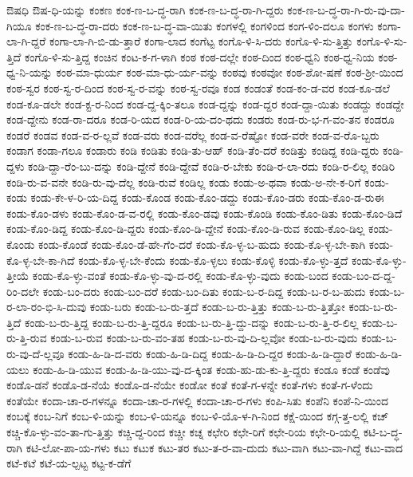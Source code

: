 {ಔಷಧಿ
ಔಷ-ಧಿ-ಯನ್ನು
ಕಂಕಣ
ಕಂಕ-ಣ-ಬ-ದ್ಧ-ರಾಗಿ
ಕಂಕ-ಣ-ಬ-ದ್ಧ-ರಾ-ಗಿ-ದ್ದರು
ಕಂಕ-ಣ-ಬ-ದ್ಧ-ರಾ-ಗಿ-ರು-ವು-ದಾ-ಗಿಯೂ
ಕಂಕ-ಣ-ಬ-ದ್ಧ-ರಾ-ದರು
ಕಂಕ-ಣ-ಬ-ದ್ಧ-ವಾ-ಯಿತು
ಕಂಗಳಲ್ಲಿ
ಕಂಗಳಿಂದ
ಕಂಗ-ಳಿಂ-ದಲೂ
ಕಂಗಳು
ಕಂಗಾ-ಲಾ-ಗಿ-ದ್ದರೆ
ಕಂಗಾ-ಲಾ-ಗಿ-ಬಿ-ಡು-ತ್ತಾರೆ
ಕಂಗಾ-ಲಾದ
ಕಂಗೆಟ್ಟ
ಕಂಗೊ-ಳಿ-ಸಿ-ದರು
ಕಂಗೊ-ಳಿ-ಸು-ತ್ತಿತ್ತು
ಕಂಗೊ-ಳಿ-ಸು-ತ್ತಿದೆ
ಕಂಗೊ-ಳಿ-ಸು-ತ್ತಿದ್ದ
ಕಂಚಿನ
ಕಂಟ-ಕ-ಗ-ಳಾಗಿ
ಕಂಠ
ಕಂಠ-ದಲ್ಲೇ
ಕಂಠ-ದಿಂದ
ಕಂಠ-ಧ್ವನಿ
ಕಂಠ-ಧ್ವ-ನಿಯ
ಕಂಠ-ಧ್ವ-ನಿ-ಯನ್ನು
ಕಂಠ-ಮಾ-ಧುರ್ಯ
ಕಂಠ-ಮಾ-ಧು-ರ್ಯ-ವನ್ನು
ಕಂಠವು
ಕಂಠವೋ
ಕಂಠ-ಶೋ-ಷಣೆ
ಕಂಠ-ಶ್ರೀ-ಯಿಂದ
ಕಂಠ-ಸ್ವರ
ಕಂಠ-ಸ್ವ-ರ-ದಿಂದ
ಕಂಠ-ಸ್ವ-ರ-ವನ್ನು
ಕಂಠ-ಸ್ವ-ರವೂ
ಕಂಡ
ಕಂಡಂತೆ
ಕಂಡ-ಕಂ-ಡ-ವರ
ಕಂಡ-ಕೂ-ಡಲೆ
ಕಂಡ-ಕೂ-ಡಲೇ
ಕಂಡ-ಕ್ಟ-ರ-ನಿಂದ
ಕಂಡ-ದ್ದ-ಕ್ಕಿಂ-ತಲೂ
ಕಂಡ-ದ್ದನ್ನು
ಕಂಡ-ದ್ದರ
ಕಂಡ-ದ್ದಾ-ಯಿತು
ಕಂಡದ್ದು
ಕಂಡದ್ದೇ
ಕಂಡ-ದ್ದೇನು
ಕಂಡ-ರಾ-ದರೂ
ಕಂಡ-ರಿ-ಯದ
ಕಂಡ-ರಿ-ಯ-ದಂ-ಥದು
ಕಂಡರು
ಕಂಡ-ರು-ಭ-ಗ-ವಂ-ತನ
ಕಂಡರೂ
ಕಂಡರೆ
ಕಂಡವ
ಕಂಡ-ವ-ರ-ಲ್ಲವೆ
ಕಂಡ-ವರು
ಕಂಡ-ವರೆಲ್ಲ
ಕಂಡ-ವ-ರೆಷ್ಟೋ
ಕಂಡ-ವರೇ
ಕಂಡ-ವ-ರೊ-ಬ್ಬರು
ಕಂಡಾಗ
ಕಂಡಾ-ಗಲೂ
ಕಂಡಾರು
ಕಂಡಿ
ಕಂಡಿತು
ಕಂಡಿ-ತು-ಆಹ್
ಕಂಡಿ-ತೆಂ-ದರೆ
ಕಂಡಿತ್ತು
ಕಂಡಿದ್ದ
ಕಂಡಿ-ದ್ದರು
ಕಂಡಿ-ದ್ದಳು
ಕಂಡಿ-ದ್ದಾ-ರೆಂ-ಬು-ದನ್ನು
ಕಂಡಿ-ದ್ದೇನೆ
ಕಂಡಿ-ದ್ದೇವೆ
ಕಂಡಿ-ರ-ಬೇಕು
ಕಂಡಿ-ರ-ಲಾ-ರದು
ಕಂಡಿ-ರ-ಲಿಲ್ಲ
ಕಂಡಿರಿ
ಕಂಡಿ-ರು-ವ-ವನೇ
ಕಂಡಿ-ರು-ವು-ದೆಲ್ಲ
ಕಂಡಿ-ರುವೆ
ಕಂಡಿಲ್ಲ
ಕಂಡು
ಕಂಡು-ಅ-ಥವಾ
ಕಂಡು-ಅ-ನೇ-ಕ-ರಿಗೆ
ಕಂಡು-ಕಂಡು
ಕಂಡು-ಕೇ-ಳ-ರಿ-ಯ-ದಿದ್ದ
ಕಂಡು-ಕೊಂಡ
ಕಂಡು-ಕೊಂ-ಡದ್ದು
ಕಂಡು-ಕೊಂ-ಡರು
ಕಂಡು-ಕೊಂ-ಡ-ರುಈ
ಕಂಡು-ಕೊಂ-ಡಳು
ಕಂಡು-ಕೊಂ-ಡ-ವ-ರಲ್ಲಿ
ಕಂಡು-ಕೊಂ-ಡವು
ಕಂಡು-ಕೊಂಡಿ
ಕಂಡು-ಕೊಂ-ಡಿತು
ಕಂಡು-ಕೊಂ-ಡಿದೆ
ಕಂಡು-ಕೊಂ-ಡಿದ್ದ
ಕಂಡು-ಕೊಂ-ಡಿ-ದ್ದರು
ಕಂಡು-ಕೊಂ-ಡಿ-ದ್ದೇನೆ
ಕಂಡು-ಕೊಂ-ಡಿ-ರುವ
ಕಂಡು-ಕೊಂ-ಡಿಲ್ಲ
ಕಂಡು-ಕೊಂಡು
ಕಂಡು-ಕೊಂಡೆ
ಕಂಡು-ಕೊಂ-ಡೆ-ಹೇ-ಗೆಂ-ದರೆ
ಕಂಡು-ಕೊ-ಳ್ಳ-ಬ-ಹುದು
ಕಂಡು-ಕೊ-ಳ್ಳ-ಬೇ-ಕಾಗಿ
ಕಂಡು-ಕೊ-ಳ್ಳ-ಬೇ-ಕಾ-ಗಿದೆ
ಕಂಡು-ಕೊ-ಳ್ಳ-ಬೇ-ಕೆಂದು
ಕಂಡು-ಕೊ-ಳ್ಳಲು
ಕಂಡು-ಕೊಳ್ಳಿ
ಕಂಡು-ಕೊ-ಳ್ಳು-ತ್ತದೆ
ಕಂಡು-ಕೊ-ಳ್ಳು-ತ್ತೀಯೆ
ಕಂಡು-ಕೊ-ಳ್ಳು-ವಂತೆ
ಕಂಡು-ಕೊ-ಳ್ಳು-ವು-ದ-ರಲ್ಲಿ
ಕಂಡು-ಕೊ-ಳ್ಳು-ವುದು
ಕಂಡು-ಬಂದ
ಕಂಡು-ಬಂ-ದ-ದ್ದ-ರಿಂ-ದಲೇ
ಕಂಡು-ಬಂ-ದರು
ಕಂಡು-ಬಂ-ದರೆ
ಕಂಡು-ಬಂ-ದಿತು
ಕಂಡು-ಬ-ರ-ದಿದ್ದ
ಕಂಡು-ಬ-ರ-ಬ-ಹುದು
ಕಂಡು-ಬ-ರ-ಲಾ-ರಂ-ಭಿ-ಸಿ-ದುವು
ಕಂಡು-ಬರು
ಕಂಡು-ಬ-ರು-ತ್ತದೆ
ಕಂಡು-ಬ-ರು-ತ್ತಿತ್ತು
ಕಂಡು-ಬ-ರು-ತ್ತಿತ್ತೋ
ಕಂಡು-ಬ-ರು-ತ್ತಿದೆ
ಕಂಡು-ಬ-ರು-ತ್ತಿದ್ದ
ಕಂಡು-ಬ-ರು-ತ್ತಿ-ದ್ದರೂ
ಕಂಡು-ಬ-ರು-ತ್ತಿ-ದ್ದು-ದನ್ನು
ಕಂಡು-ಬ-ರು-ತ್ತಿ-ರ-ಲಿಲ್ಲ
ಕಂಡು-ಬ-ರು-ತ್ತಿ-ರುವ
ಕಂಡು-ಬ-ರುವ
ಕಂಡು-ಬ-ರು-ವಂ-ತಹ
ಕಂಡು-ಬ-ರು-ವು-ದಿ-ಲ್ಲವೋ
ಕಂಡು-ಬ-ರು-ವುದು
ಕಂಡು-ಬ-ರು-ವು-ದೆ-ಲ್ಲವೂ
ಕಂಡು-ಹಿ-ಡಿ-ದ-ವರು
ಕಂಡು-ಹಿ-ಡಿ-ದಿದ್ದ
ಕಂಡು-ಹಿ-ಡಿ-ದಿ-ದ್ದರ
ಕಂಡು-ಹಿ-ಡಿ-ದ್ದಾರೆ
ಕಂಡು-ಹಿ-ಡಿ-ಯಲು
ಕಂಡು-ಹಿ-ಡಿ-ಯುವ
ಕಂಡು-ಹಿ-ಡಿ-ಯು-ವು-ದ-ಕ್ಕಿಂತ
ಕಂಡು-ಹು-ಡು-ಕು-ತ್ತಿ-ದ್ದರು
ಕಂಡೂ
ಕಂಡೆ
ಕಂಡೆವು
ಕಂಡೊ-ಡನೆ
ಕಂಡೊ-ಡ-ನೆಯೆ
ಕಂಡೊ-ಡ-ನೆಯೇ
ಕಂಡೋ
ಕಂತೆ
ಕಂತೆ-ಗ-ಳನ್ನೇ
ಕಂತೆ-ಗಳು
ಕಂತೆ-ಗ-ಳೆಂದು
ಕಂತೆಯೇ
ಕಂದಾ-ಚಾ-ರ-ಗಳನ್ನೂ
ಕಂದಾ-ಚಾ-ರ-ಗಳಲ್ಲಿ
ಕಂದಾ-ಚಾ-ರ-ಗಳು
ಕಂಪಿ-ಸಿತು
ಕಂಪೆನಿ
ಕಂಪೆ-ನಿ-ಯಿಂದ
ಕಂಬಕ್ಕೆ
ಕಂಬ-ನಿಗೆ
ಕಂಬ-ಳಿ-ಯನ್ನು
ಕಂಬ-ಳಿ-ಯನ್ನೂ
ಕಂಬ-ಳಿ-ಯೊ-ಳ-ಗಿ-ನಿಂದ
ಕಕ್ಷೆ-ಯಿಂದ
ಕಗ್ಗ-ತ್ತ-ಲಲ್ಲಿ
ಕಚ್
ಕಚ್ಚಿ-ಕೊ-ಳ್ಳು-ವಂ-ತಾ-ಗು-ತ್ತಿತ್ತು
ಕಚ್ಚಿ-ದ್ದ-ರಿಂದ
ಕಚ್ಚೀ
ಕಚ್ನ
ಕಛೇರಿ
ಕಛೇ-ರಿಗೆ
ಕಛೇ-ರಿಯ
ಕಛೇ-ರಿ-ಯಲ್ಲಿ
ಕಟಿ-ಬ-ದ್ಧ-ರಾಗಿ
ಕಟಿ-ಲೋ-ಪಾ-ಯ-ಗಳು
ಕಟು
ಕಟುಕ
ಕಟು-ತರ
ಕಟು-ತ-ರ-ವಾ-ದುದು
ಕಟು-ವಾಗಿ
ಕಟು-ವಾ-ಗಿದ್ದೆ
ಕಟು-ವಾದ
ಕಟೆ-ಕಟೆ
ಕಟೆ-ಯ-ಲ್ಪಟ್ಟ
ಕಟ್ಟ-ಕ-ಡೆಗೆ
}
